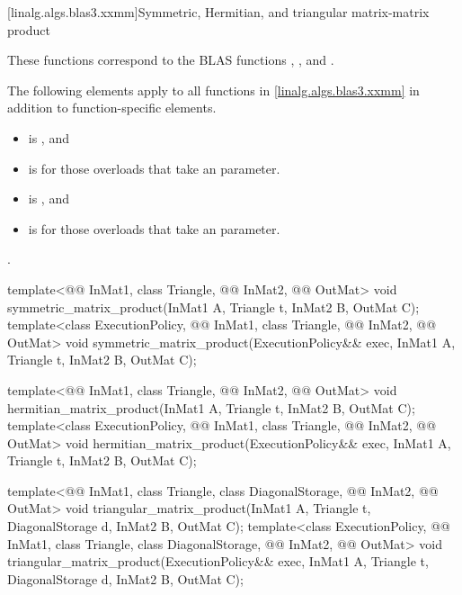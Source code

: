 [linalg.algs.blas3.xxmm]{Symmetric, Hermitian, and triangular matrix-matrix product}

\pnum
\begin{note}
These functions correspond to the BLAS functions
, , and .
\end{note}

\pnum
The following elements apply to all functions in \ref{linalg.algs.blas3.xxmm}
in addition to function-specific elements.

\pnum
\mandates
\begin{itemize}
\item
{}
is , and
\item
{}
is  for those overloads that take an  parameter.
\end{itemize}

\pnum
\expects
\begin{itemize}
\item
{} is , and
\item
{}
is  for those overloads that take an  parameter.
\end{itemize}

\pnum
\complexity
{}.

\begin{itemdecl}
template<@@ InMat1, class Triangle, @@ InMat2, @@ OutMat>
  void symmetric_matrix_product(InMat1 A, Triangle t, InMat2 B, OutMat C);
template<class ExecutionPolicy,
         @@ InMat1, class Triangle, @@ InMat2, @@ OutMat>
  void symmetric_matrix_product(ExecutionPolicy&& exec, InMat1 A, Triangle t, InMat2 B, OutMat C);

template<@@ InMat1, class Triangle, @@ InMat2, @@ OutMat>
  void hermitian_matrix_product(InMat1 A, Triangle t, InMat2 B, OutMat C);
template<class ExecutionPolicy,
         @@ InMat1, class Triangle, @@ InMat2, @@ OutMat>
  void hermitian_matrix_product(ExecutionPolicy&& exec, InMat1 A, Triangle t, InMat2 B, OutMat C);

template<@@ InMat1, class Triangle, class DiagonalStorage,
         @@ InMat2, @@ OutMat>
  void triangular_matrix_product(InMat1 A, Triangle t, DiagonalStorage d, InMat2 B, OutMat C);
template<class ExecutionPolicy, @@ InMat1, class Triangle, class DiagonalStorage,
         @@ InMat2, @@ OutMat>
  void triangular_matrix_product(ExecutionPolicy&& exec,
                                 InMat1 A, Triangle t, DiagonalStorage d, InMat2 B, OutMat C);
\end{itemdecl}

